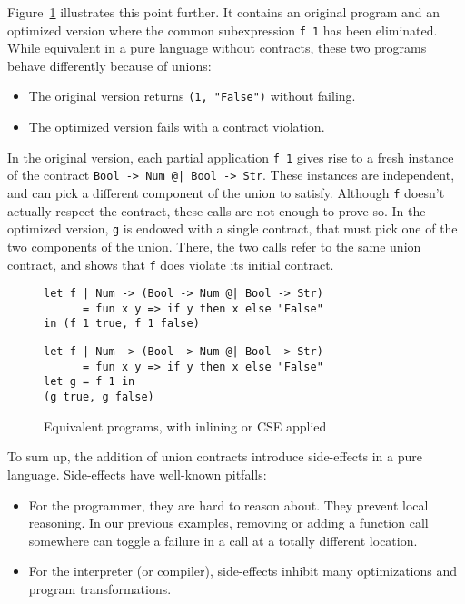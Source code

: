 \documentclass[sigplan,10pt,review,anonymous]{acmart}
\newcommand{\unsure}[2][1=]{}
\newcommand{\nickel}[1]{\lstinline[language=nickel]{#1}}
\begin{document}
Figure~\ref{fig:optimized-programs} illustrates this point further. It contains
an original program and an optimized version where the common subexpression
\nickel{f 1} has been eliminated. While equivalent in a pure language without
contracts, these two programs behave differently because of unions:

\begin{itemize}
    \item The original version returns \nickel{(1, "False")} without failing.
    \item The optimized version fails with a contract violation.
\end{itemize}

In the original version, each partial application \nickel{f 1} gives rise to a
fresh instance of the contract \nickel{Bool -> Num @| Bool -> Str}. These
instances are independent, and can pick a different component of the union to
satisfy. Although \nickel{f} doesn't actually respect the contract, these calls
are not enough to prove so. In the optimized version, \nickel{g} is endowed with
a single contract, that must pick one of the two components of the union. There,
the two calls refer to the same union contract, and shows that \nickel{f} does
violate its initial contract.

\begin{figure}[h]
\begin{lstlisting}[language=nickel, title=Original]
let f | Num -> (Bool -> Num @| Bool -> Str)
      = fun x y => if y then x else "False"
in (f 1 true, f 1 false)
\end{lstlisting}
\begin{lstlisting}[language=nickel, title=Optimized]
let f | Num -> (Bool -> Num @| Bool -> Str)
      = fun x y => if y then x else "False"
let g = f 1 in
(g true, g false)
\end{lstlisting}
\caption{Equivalent programs, with inlining or CSE applied}
\label{fig:optimized-programs}
\end{figure}

\unsure{These arguments should go in the purity section}
To sum up, the addition of union contracts introduce side-effects in a pure
language. Side-effects have well-known pitfalls:
\begin{itemize}
    \item For the programmer, they are hard to reason about. They prevent local
        reasoning. In our previous examples, removing or adding a function call
        somewhere can toggle a failure in a call at a totally different
        location.
    \item For the interpreter (or compiler), side-effects inhibit many optimizations and
        program transformations.
\end{itemize}
\end{document}
